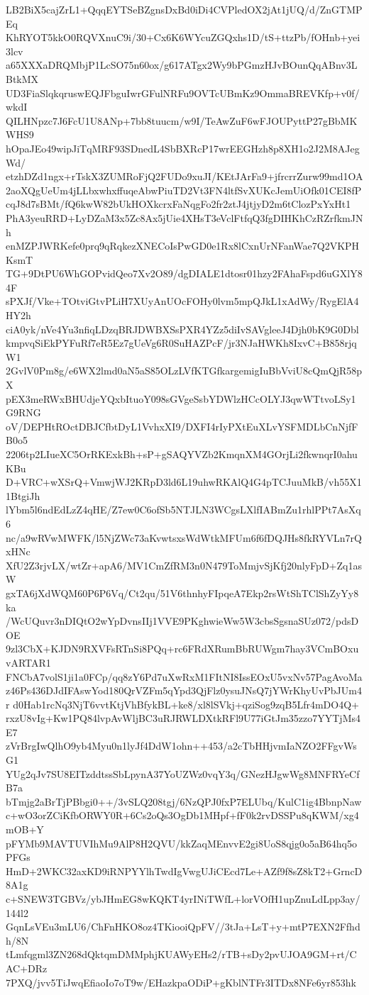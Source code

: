 LB2BiX5cajZrL1+QqqEYTSeBZgnsDxBd0iDi4CVPledOX2jAt1jUQ/d/ZnGTMPEq
KhRYOT5kkO0RQVXnuC9i/30+Cx6K6WYcuZGQxhs1D/tS+ttzPb/fOHnb+yei3lcv
a65XXXaDRQMbjP1LcSO75n60ox/g617ATgx2Wy9bPGmzHJvBOunQqABnv3LBtkMX
UD3FiaSlqkqruswEQJFbguIwrGFulNRFu9OVTcUBmKz9OmmaBREVKfp+v0f/wkdI
QILHNpzc7J6FcU1U8ANp+7bb8tuucm/w9I/TeAwZuF6wFJOUPyttP27gBbMKWHS9
hOpaJEo49wipJiTqMRF93SDnedL4SbBXRcP17wrEEGHzh8p8XH1o2J2M8AJegWd/
etzhDZd1ngx+rTskX3ZUMRoFjQ2FUDo9xuJI/KEtJArFa9+jfrcrrZurw99md1OA
2aoXQgUeUm4jLLbxwhxffuqeAbwPiuTD2Vt3FN4ltfSvXUKcJemUiOfk01CEI8fP
cqJ8d7sBMt/fQ6kwW82bUkHOXkcrxFaNqgFo2fr2ztJ4jtjyD2m6tClozPxYxHt1
PhA3yeuRRD+LyDZaM3x5Zc8Ax5jUie4XHsT3eVclFtfqQ3fgDIHKhCzRZrfkmJNh
enMZPJWRKefe0prq9qRqkezXNECoIsPwGD0e1Rx8lCxnUrNFanWae7Q2VKPHKsmT
TG+9DtPU6WhGOPvidQeo7Xv2O89/dgDIALE1dtosr01hzy2FAhaFspd6uGXlY84F
sPXJf/Vke+TOtviGtvPLiH7XUyAnUOcFOHy0lvm5mpQJkL1xAdWy/RygElA4HY2h
ciA0yk/nVe4Yu3nfiqLDzqBRJDWBXSsPXR4YZz5diIvSAVgleeJ4Djh0bK9G0Dbl
kmpvqSiEkPYFuRf7eR5Ez7gUeVg6R0SuHAZPcF/jr3NJaHWKh8IxvC+B858rjqW1
2GvlV0Pm8g/e6WX2lmd0aN5aS85OLzLVfKTGfkargemigIuBbVviU8cQmQjR58pX
pEX3meRWxBHUdjeYQxbItuoY098sGVgeSsbYDWlzHCcOLYJ3qwWTtvoLSy1G9RNG
oV/DEPHtROctDBJCfbtDyL1VvhxXI9/DXFI4rIyPXtEuXLvYSFMDLbCnNjfFB0o5
2206tp2LIueXC5OrRKExkBh+sP+gSAQYVZb2KmqnXM4GOrjLi2fkwnqrI0ahuKBu
D+VRC+wXSrQ+VmwjWJ2KRpD3ld6L19uhwRKAlQ4G4pTCJuuMkB/vh55X11BtgiJh
lYbm5l6ndEdLzZ4qHE/Z7ew0C6ofSb5NTJLN3WCgsLXlfIABmZu1rhlPPt7AsXq6
nc/a9wRVwMWFK/l5NjZWc73aKvwtsxsWdWtkMFUm6f6fDQJHs8fkRYVLn7rQxHNc
XfU2Z3rjvLX/wtZr+apA6/MV1CmZfRM3n0N479ToMmjvSjKfj20nlyFpD+Zq1asW
gxTA6jXdWQM60P6P6Vq/Ct2qu/51V6thnhyFIpqeA7Ekp2rsWtShTClShZyYy8ka
/WcUQuvr3nDIQtO2wYpDvnsIIj1VVE9PKghwieWw5W3cbsSgsnaSUz072/pdsDOE
9zl3CbX+KJDN9RXVFsRTnSi8PQq+rc6FRdXRumBbRUWgm7hay3VCmBOxuvARTAR1
FNCbA7volS1ji1a0FCp/qq8zY6Pd7uXwRxM1FItNI8IssEOxU5vxNv57PagAvoMa
z46Ps436DJdIFAswYod180QrVZFm5qYpd3QjFlz0ysuJNsQ7jYWrKhyUvPbJUm4r
d0Hab1rcNq3NjT6vvtKtjVhBfykBL+ke8/xl8lSVkj+qziSog9zqB5Lfr4mDO4Q+
rxzU8vIg+Kw1PQ84lvpAvWljBC3uRJRWLDXtkRFl9U77iGtJm35zzo7YYTjMs4E7
zVrBrgIwQlhO9yb4Myu0n1lyJf4DdW1ohn++453/a2cTbHHjvmIaNZO2FFgvWsG1
YUg2qJv7SU8EITzddtssSbLpynA37YoUZWz0vqY3q/GNezHJgwWg8MNFRYeCfB7a
bTmjg2aBrTjPBbgi0++/3vSLQ208tgj/6NzQPJ0fxP7ELUbq/KulC1ig4BbnpNaw
c+wO3orZCiKfbORWY0R+6Cs2oQs3OgDb1MHpf+fF0k2rvDSSPu8qKWM/xg4mOB+Y
pFYMb9MAVTUVIhMu9AlP8H2QVU/kkZaqMEnvvE2gi8UoS8qjg0o5aB64hq5oPFGs
HmD+2WKC32axKD9iRNPYYlhTwdIgVwgUJiCEcd7Le+AZf9f8sZ8kT2+GrncD8A1g
c+SNEW3TGBVz/ybJHmEG8wKQKT4yrINiTWfL+lorVOfH1upZnuLdLpp3ay/144l2
GqnLsVEu3mLU6/ChFnHKO8oz4TKiooiQpFV//3tJa+LsT+y+mtP7EXN2Ffhdh/8N
tLmfqgml3ZN268dQktqmDMMphjKUAWyEHs2/rTB+sDy2pvUJOA9GM+rt/CAC+DRz
7PXQ/jvv5TiJwqEfiaoIo7oT9w/EHazkpaODiP+gKblNTFr3ITDx8NFe6yr853hk
